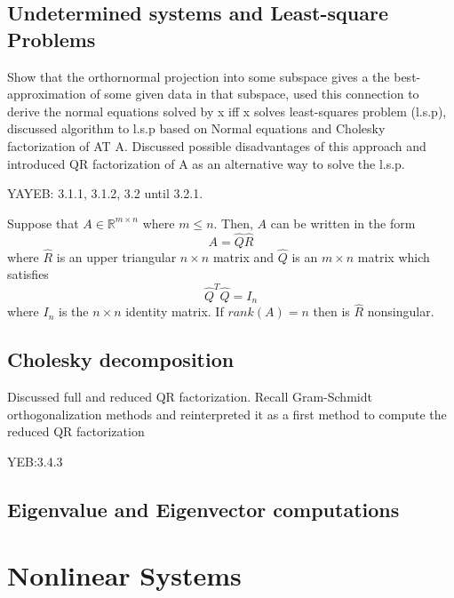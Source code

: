 \documentclass{article}
\theoremstyle{remark}
\begin{document}
\subsection{Undetermined systems and Least-square Problems}%
\label{sub:undetermined_systems_and_least_square_problems}
\begin{tcolorbox}
  Show that the orthornormal projection into some subspace gives a the best-approximation of some given data in that subspace, used this connection to derive the normal equations solved by x iff x solves least-squares problem (l.s.p), discussed algorithm to l.s.p based on Normal equations and Cholesky factorization of AT A. Discussed possible disadvantages of this approach and introduced QR factorization of A as an alternative way to solve the l.s.p.	
  \par
  YAYEB: 3.1.1, 3.1.2, 3.2 until 3.2.1.

\end{tcolorbox}


\begin{theorem}
  Suppose that $A \in \mathbb{R}^{m \times  n }$ where $ m \le n$.  Then, $A$ can be written in the form \[
  A = \hat{Q} \hat{R}
  \] 
  where $\hat{R}$ is an upper triangular $n \times n $ matrix and $\hat{Q}$ is an $m \times  n $ matrix which satisfies \[
  \hat{Q}^{T} \hat{Q} =  I_n
  \] where $I_n$ is the $n \times n $ identity matrix. If $rank\left( A \right) = n$ then is $\hat{R}$ nonsingular.
\end{theorem}


\subsection{Cholesky decomposition}%
\label{sub:chelesky_decomposition}
\begin{tcolorbox}
  Discussed full and reduced QR factorization. Recall Gram-Schmidt orthogonalization methods and reinterpreted it as a first method to compute the reduced QR factorization	
  \par
  YEB:3.4.3
\end{tcolorbox}

\subsection{Eigenvalue and Eigenvector computations}%
\label{sub:eigenvalue_and_eigenvector_computations}

\newpage
\section{Nonlinear Systems}%
\label{sec:nonlinear_systems}
\end{document}
